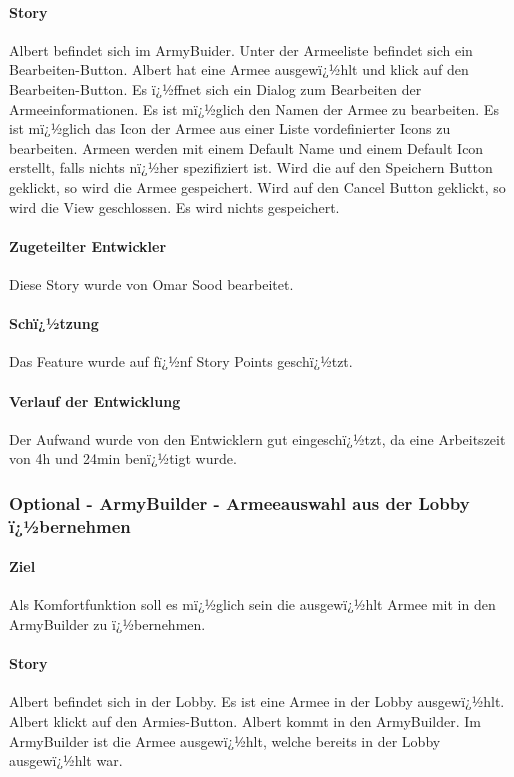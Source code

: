 \documentclass[12pt, titlepage]{scrartcl}
\begin{document}
			\paragraph{Story}Albert befindet sich im ArmyBuider. Unter der Armeeliste befindet sich ein Bearbeiten-Button. Albert hat eine Armee ausgewï¿½hlt und klick auf den Bearbeiten-Button. Es ï¿½ffnet sich ein Dialog zum Bearbeiten der Armeeinformationen. Es ist mï¿½glich den Namen der Armee zu bearbeiten. Es ist mï¿½glich das Icon der Armee aus einer Liste vordefinierter Icons zu bearbeiten. Armeen werden mit einem Default Name und einem Default Icon erstellt, falls nichts nï¿½her spezifiziert ist. Wird die auf den Speichern Button geklickt, so wird die Armee gespeichert. Wird auf den Cancel Button geklickt, so wird die View geschlossen. Es wird nichts gespeichert.
			\paragraph{Zugeteilter Entwickler} Diese Story wurde von Omar Sood bearbeitet.
			\paragraph{Schï¿½tzung}
			Das Feature wurde auf fï¿½nf Story Points geschï¿½tzt.
			\paragraph{Verlauf der Entwicklung} 
			Der Aufwand wurde von den Entwicklern gut eingeschï¿½tzt, da eine Arbeitszeit von 4h und 24min benï¿½tigt wurde.
		
			\subsubsection{Optional - ArmyBuilder - Armeeauswahl aus der Lobby ï¿½bernehmen}
			\paragraph{Ziel} Als Komfortfunktion soll es mï¿½glich sein die ausgewï¿½hlt Armee mit in den ArmyBuilder zu ï¿½bernehmen.
			\paragraph{Story} Albert befindet sich in der Lobby. Es ist eine Armee in der Lobby ausgewï¿½hlt. Albert klickt auf den Armies-Button. Albert kommt in den ArmyBuilder. Im ArmyBuilder ist die Armee ausgewï¿½hlt, welche bereits in der Lobby ausgewï¿½hlt war.
\end{document}
